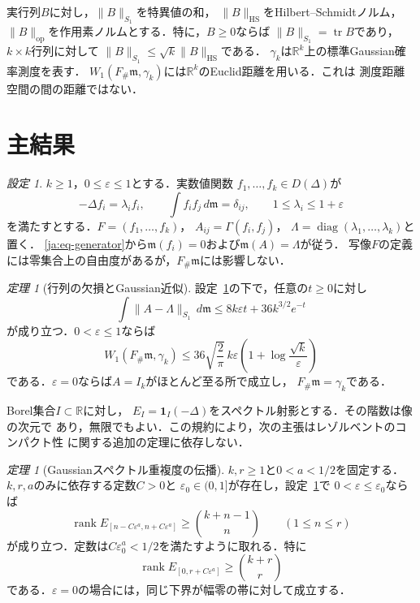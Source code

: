 \documentclass[12pt]{amsart}
\theoremstyle{definition}
\theoremstyle{remark}
\numberwithin{equation}{section}
\newcommand{\rank}{\operatorname{rank}}
\DeclareMathOperator{\tr}{tr}
\newcommand{\R}{\mathbb{R}}
\newcommand{\m}{\mathfrak m}
\theoremstyle{jpplain}
\newtheorem{jthm}[thm]{定理}
\newtheorem{jsetup}[thm]{設定}
\begin{document}
実行列$B$に対し，$\|B\|_{S_1}$を特異値の和，
$\|B\|_{\mathrm{HS}}$をHilbert--Schmidtノルム，
$\|B\|_{\mathrm{op}}$を作用素ノルムとする．特に，$B\geq0$ならば
$\|B\|_{S_1}=\tr B$であり，$k\times k$行列に対して
$\|B\|_{S_1}\leq\sqrt{k}\|B\|_{\mathrm{HS}}$である．
$\gamma_k$は$\R^k$上の標準Gaussian確率測度を表す．
$W_1(F_\#\m,\gamma_k)$には$\R^k$のEuclid距離を用いる．これは
測度距離空間の間の距離ではない．

\section{主結果}

\begin{jsetup}\label{ja:setup}
$k\geq1$，$0\leq\varepsilon\leq1$とする．実数値関数
$f_1,\ldots,f_k\in D(\Delta)$が
\begin{equation}\label{ja:eq-eigen}
 -\Delta f_i=\lambda_i f_i,\qquad
 \int f_i f_j\,d\m=\delta_{ij},\qquad
 1\leq\lambda_i\leq1+\varepsilon
\end{equation}
を満たすとする．$F=(f_1,\ldots,f_k)$，
$A_{ij}=\Gamma(f_i,f_j)$，
$\Lambda=\operatorname{diag}(\lambda_1,\ldots,\lambda_k)$と置く．
\eqref{ja:eq-generator}から$\m(f_i)=0$および$\m(A)=\Lambda$が従う．
写像$F$の定義には零集合上の自由度があるが，$F_\#\m$には影響しない．
\end{jsetup}

\begin{jthm}[行列の欠損とGaussian近似]\label{ja:thm-gaussian}
設定~\ref{ja:setup}の下で，任意の$t\geq0$に対し
\begin{equation}\label{ja:eq-main-matrix}
 \int\|A-\Lambda\|_{S_1}\,d\m
 \leq8k\varepsilon t+36k^{3/2}e^{-t}
\end{equation}
が成り立つ．$0<\varepsilon\leq1$ならば
\begin{equation}\label{ja:eq-main-W}
 W_1(F_\#\m,\gamma_k)
 \leq36\sqrt{\frac2\pi}\,k\varepsilon
 \left(1+\log\frac{\sqrt{k}}{\varepsilon}\right)
\end{equation}
である．$\varepsilon=0$ならば$A=I_k$がほとんど至る所で成立し，
$F_\#\m=\gamma_k$である．
\end{jthm}

Borel集合$I\subset\R$に対し，
$E_I=\mathbf1_I(-\Delta)$をスペクトル射影とする．その階数は像の次元で
あり，無限でもよい．この規約により，次の主張はレゾルベントのコンパクト性
に関する追加の定理に依存しない．

\begin{jthm}[Gaussianスペクトル重複度の伝播]\label{ja:thm-bands}
$k,r\geq1$と$0<a<1/2$を固定する．$k,r,a$のみに依存する定数$C>0$と
$\varepsilon_0\in(0,1]$が存在し，設定~\ref{ja:setup}で
$0<\varepsilon\leq\varepsilon_0$ならば
\begin{equation}\label{ja:eq-bands}
 \rank E_{[n-C\varepsilon^a,n+C\varepsilon^a]}
 \geq\binom{k+n-1}{n}\qquad(1\leq n\leq r)
\end{equation}
が成り立つ．定数は$C\varepsilon_0^a<1/2$を満たすように取れる．特に
\begin{equation}\label{ja:eq-count}
 \rank E_{[0,r+C\varepsilon^a]}\geq\binom{k+r}{r}
\end{equation}
である．$\varepsilon=0$の場合には，同じ下界が幅零の帯に対して成立する．
\end{jthm}
\end{document}
